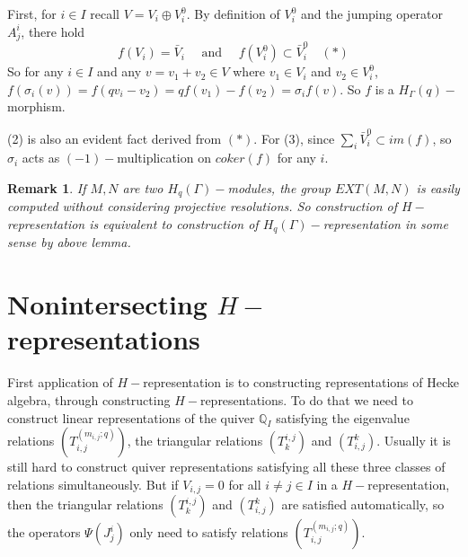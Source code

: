 \def\CTEXPreproc{Created by ctex v0.2.12, don't edit!}\documentclass[11pt]{article}
\newtheorem{rem}{Remark}[section]
\begin{document}
    \begin{pf}
    First, for $i\in I$ recall $V= V_i \oplus V^0 _i$. By definition of $V^0 _i$ and the jumping operator $A^i _j$, there hold
\[f( V_i ) = \bar{V}_i \quad \text{ and }\quad f( V^0 _i ) \subset \bar{V}^0 _i \quad  (*)\]
 So for any $i\in I$ and any $v=v_1 +v_2 \in V$ where $v_1 \in V_i $ and $v_2 \in V^0 _i$,
     $f(  \sigma_i (v) )= f( q v_i - v_2  )= q f(v_1) -f(v_2)= \sigma_i f(v) $. So $f$ is a $H_{\Gamma}(q)-$morphism.

     (2) is also an evident fact derived from $(*)$. For (3), since $\sum_i \bar{V}^0 _i \subset im (f)$, so $\sigma_i$ acts as
     $(-1)-$multiplication on $coker(f)$ for any $i$.

    \end{pf}

    \begin{rem} If $M,N$ are two $H_q (\Gamma)-$modules, the group $EXT(M,N)$ is easily computed without considering projective resolutions. So construction of $H-$representation  is equivalent to construction of $H_q (\Gamma)-$representation in some sense by above lemma.

    \end{rem}


















\section{ Nonintersecting $H-$representations  }

  First application of  $H-$representation is to constructing representations of Hecke algebra, through constructing $H-$representations. To do that we need to construct linear representations of the quiver $\mathbb{Q}_{I}$ satisfying the eigenvalue relations $(T^{(m_{i,j};q)}_{i,j})$, the  triangular relations $(T^{i,j} _{k} )$ and $( T^k _{i,j}  )$. Usually it is still  hard to construct quiver representations satisfying all these three classes of relations simultaneously. But if $V_{i,j}=0$ for all $i\neq j\in I$ in a $H-$representation, then the triangular relations $(T^{i,j} _{k} )$ and $( T^k _{i,j}  )$ are satisfied automatically, so the operators $\Psi ( J^i _j  )$ only need to satisfy  relations $( T^{(m_{i,j};q)}_{i,j} )$.
\end{document}
